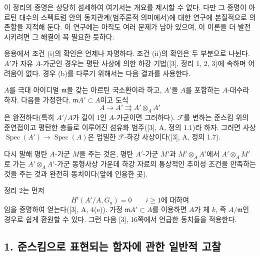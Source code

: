 이 정리의 증명은 상당히 섬세하여 여기서는 개요를 제시할 수 없다. 다만
그 증명이 아르틴 대수의 스펙트럼 안의 동치관계(범주론적 의미에서)에 대한
연구에 본질적으로 의존함을 지적해 둔다. 이 연구에는 아직도 여러 문제가
남아 있으며, 이 이론을 더 발전시키려면 그 해결이 꼭 필요한 듯하다.

응용에서 조건 (i)의 확인은 언제나 자명하다. 조건 (ii)의 확인은 두
부분으로 나뉜다. $A'$가 자유 $A$-가군인 경우는 평탄 사상에 의한 하강
기법([3], 정리 1, 2, 3)에 속하며 어려움이 없다. 경우 (b)를 다루기
위해서는 다음 결과를 사용한다.

 $A$를 극대 아이디얼 $\mathfrak m$을 갖는 아르틴
국소환이라 하고, $A'$을 $A$를 포함하는 $A$-대수라 하자. 다음을 가정한다.
$\mathfrak mA'\subset A$이고 도식
\[
  A\longrightarrow A'\rightrightarrows A'\otimes_A A'
\]
은 완전하다(특히 $A'/A$가 길이 1인 $A$-가군이면 그러하다).
$\mathcal F$를 변하는 준스킴 위의 준연접이고 평탄한 층들로 이루어진
섬유화 범주([3], A, 정의 1.1)라 하자. 그러면 사상
$\operatorname{Spec}(A')\longrightarrow\operatorname{Spec}(A)$은 엄밀한
$\mathcal F$-하강 사상이다([3], A, 정의 1.7).

다시 말해 평탄 $A$-가군 $M$을 주는 것은, 평탄 $A'$-가군 $M'$과
$M'\otimes_AA'$에서 $A'\otimes_AM'$로 가는
$A'\otimes_AA'$-가군 동형사상 가운데 하강 자료의 통상적인 추이성 조건을
만족하는 것을 주는 것과 완전히 동치이다(앞에 인용한 곳).

정리 2는 먼저
\[
  H^i(A'/A,G_a)=0\qquad\text{$i\geq 1$에 대하여}
\]
임을 증명하여 얻는다([3], A, 4(e)). 가정 $\mathfrak mA'\subset A$를
이용하면 $A$가 체 $k$, 즉 $A/\mathfrak m$인 경우로 쉽게 환원할 수 있다.
그런 다음 [3], 16쪽에서 언급한 동치들을 적용한다.

\subsection*{1. 준스킴으로 표현되는 함자에 관한 일반적 고찰}

